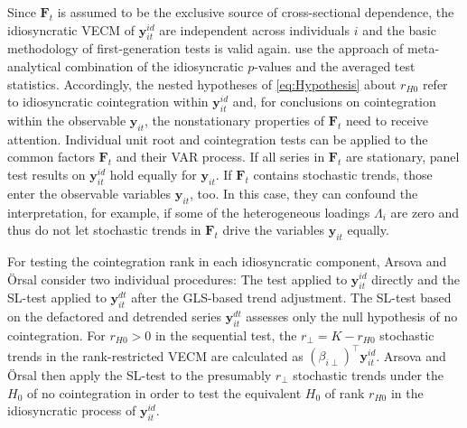 Since $ \boldsymbol{F}_t $ is assumed to be the exclusive source of cross-sectional dependence, the idiosyncratic VECM of $ \boldsymbol{y}^{i \! d}_{it} $ are independent across individuals $ i $ and the basic methodology of first-generation tests is valid again. \citet{OersalArsova2017} use the approach of meta-analytical combination of the idiosyncratic $p$-values and \citet{ArsovaOersal2018} the averaged test statistics. Accordingly, the nested hypotheses of \eqref{eq:Hypothesis} about $ r_{H0} $ refer to idiosyncratic cointegration within $ \boldsymbol{y}^{i \! d}_{it} $ and, for conclusions on cointegration within the observable $ \boldsymbol{y}_{it} $, the nonstationary properties of $ \boldsymbol{F}_t $ need to receive attention. Individual unit root and cointegration tests can be applied to the common factors $ \boldsymbol{F}_t $ and their VAR process. If all series in $ \boldsymbol{F}_t $ are stationary, panel test results on $ \boldsymbol{y}^{i \! d}_{it} $ hold equally for $ \boldsymbol{y}_{it} $. If $ \boldsymbol{F}_t $ contains stochastic trends, those enter the observable variables $ \boldsymbol{y}_{it} $, too. In this case, they can confound the interpretation, for example, if some of the heterogeneous loadings $ \Lambda_i $ are zero and thus do not let stochastic trends in $ \boldsymbol{F}_t $ drive the variables $ \boldsymbol{y}_{it} $ equally.

For testing the cointegration rank in each idiosyncratic component, Arsova and Örsal \citeyearpar{OersalArsova2017,ArsovaOersal2018} consider two individual procedures: The \citeauthor{Johansen1988} test applied to $ \boldsymbol{y}^{i \! d}_{it} $ directly and the SL-test applied to $ \boldsymbol{y}^{d \! t}_{it} $ after the GLS-based trend adjustment. The SL-test based on the defactored and detrended series $ \boldsymbol{y}^{d \! t}_{it} $ assesses only the null hypothesis of no cointegration. For $ r_{H0} > 0 $ in the sequential test, the $ r_\perp = K - r_{H0} $ stochastic trends in the rank-restricted VECM are calculated as $ \left( \beta_{i \perp} \right)^\top \boldsymbol{y}^{i \! d}_{it} $. Arsova and Örsal \citeyearpar{OersalArsova2017,ArsovaOersal2018} then apply the SL-test to the presumably $ r_\perp $ stochastic trends under the $ H_0 $ of no cointegration in order to test the equivalent $ H_0 $ of rank $ r_{H0} $ in the idiosyncratic process of $ \boldsymbol{y}^{i \! d}_{it} $. 

